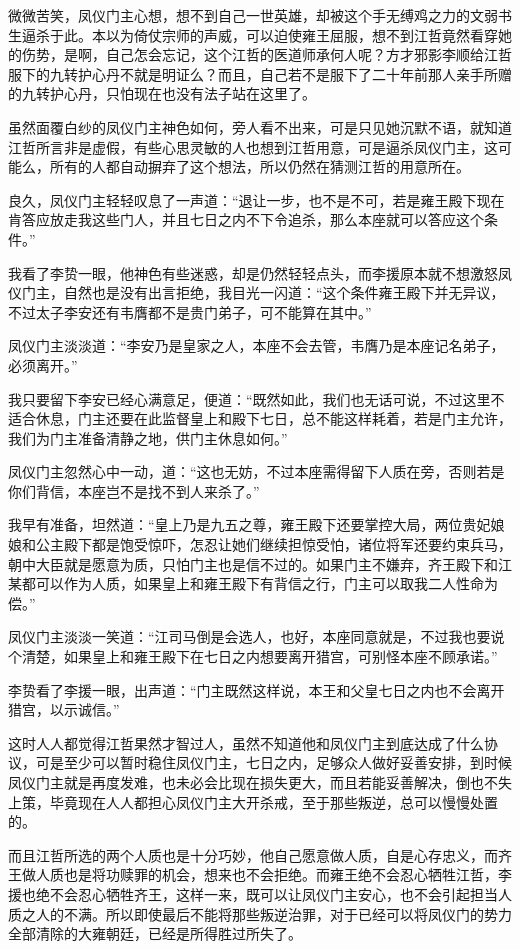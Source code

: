 微微苦笑，凤仪门主心想，想不到自己一世英雄，却被这个手无缚鸡之力的文弱书生逼杀于此。本以为倚仗宗师的声威，可以迫使雍王屈服，想不到江哲竟然看穿她的伤势，是啊，自己怎会忘记，这个江哲的医道师承何人呢？方才邪影李顺给江哲服下的九转护心丹不就是明证么？而且，自己若不是服下了二十年前那人亲手所赠的九转护心丹，只怕现在也没有法子站在这里了。

虽然面覆白纱的凤仪门主神色如何，旁人看不出来，可是只见她沉默不语，就知道江哲所言非是虚假，有些心思灵敏的人也想到江哲用意，可是逼杀凤仪门主，这可能么，所有的人都自动摒弃了这个想法，所以仍然在猜测江哲的用意所在。

良久，凤仪门主轻轻叹息了一声道：“退让一步，也不是不可，若是雍王殿下现在肯答应放走我这些门人，并且七日之内不下令追杀，那么本座就可以答应这个条件。”

我看了李贽一眼，他神色有些迷惑，却是仍然轻轻点头，而李援原本就不想激怒凤仪门主，自然也是没有出言拒绝，我目光一闪道：“这个条件雍王殿下并无异议，不过太子李安还有韦膺都不是贵门弟子，可不能算在其中。”

凤仪门主淡淡道：“李安乃是皇家之人，本座不会去管，韦膺乃是本座记名弟子，必须离开。”

我只要留下李安已经心满意足，便道：“既然如此，我们也无话可说，不过这里不适合休息，门主还要在此监督皇上和殿下七日，总不能这样耗着，若是门主允许，我们为门主准备清静之地，供门主休息如何。”

凤仪门主忽然心中一动，道：“这也无妨，不过本座需得留下人质在旁，否则若是你们背信，本座岂不是找不到人来杀了。”

我早有准备，坦然道：“皇上乃是九五之尊，雍王殿下还要掌控大局，两位贵妃娘娘和公主殿下都是饱受惊吓，怎忍让她们继续担惊受怕，诸位将军还要约束兵马，朝中大臣就是愿意为质，只怕门主也是信不过的。如果门主不嫌弃，齐王殿下和江某都可以作为人质，如果皇上和雍王殿下有背信之行，门主可以取我二人性命为偿。”

凤仪门主淡淡一笑道：“江司马倒是会选人，也好，本座同意就是，不过我也要说个清楚，如果皇上和雍王殿下在七日之内想要离开猎宫，可别怪本座不顾承诺。”

李贽看了李援一眼，出声道：“门主既然这样说，本王和父皇七日之内也不会离开猎宫，以示诚信。”

这时人人都觉得江哲果然才智过人，虽然不知道他和凤仪门主到底达成了什么协议，可是至少可以暂时稳住凤仪门主，七日之内，足够众人做好妥善安排，到时候凤仪门主就是再度发难，也未必会比现在损失更大，而且若能妥善解决，倒也不失上策，毕竟现在人人都担心凤仪门主大开杀戒，至于那些叛逆，总可以慢慢处置的。

而且江哲所选的两个人质也是十分巧妙，他自己愿意做人质，自是心存忠义，而齐王做人质也是将功赎罪的机会，想来也不会拒绝。而雍王绝不会忍心牺牲江哲，李援也绝不会忍心牺牲齐王，这样一来，既可以让凤仪门主安心，也不会引起担当人质之人的不满。所以即使最后不能将那些叛逆治罪，对于已经可以将凤仪门的势力全部清除的大雍朝廷，已经是所得胜过所失了。

